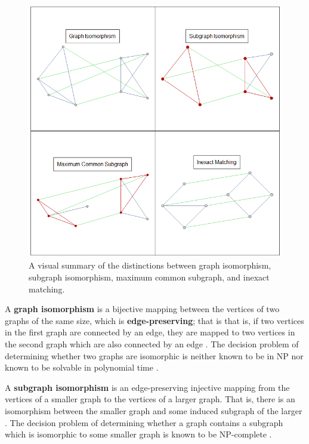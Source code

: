 \documentclass[12pt]{thesis}
\theoremstyle{plain}
\theoremstyle{definition}
\theoremstyle{remark}
\begin{document}
\begin{figure}[!t]
\centering
\includegraphics[width=\textwidth]{isomorphism_demos.png}
\caption{A visual summary of the distinctions between graph isomorphism, subgraph isomorphism, maximum common subgraph, and inexact matching.}
\label{fig:isomorphism_demos}
\end{figure}

A \textbf{graph isomorphism} is a bijective mapping between the vertices of two graphs of the same size, which is \textbf{edge-preserving}; that is  that is, if two vertices in the first graph are connected by an edge, they are mapped to two vertices in the second graph which are also connected by an edge \cite{Conte_2004}. The decision problem of determining whether two graphs are isomorphic is neither known to be in NP nor known to be solvable in polynomial time \cite{wikiGraphIsomorphism}.

A \textbf{subgraph isomorphism} is an edge-preserving injective mapping from the vertices of a smaller graph to the vertices of a larger graph. That is, there is an isomorphism between the smaller graph and some induced subgraph of the larger \cite{Conte_2004}. The decision problem of determining whether a graph contains a subgraph which is isomorphic to some smaller graph is known to be NP-complete \cite{wikiSubgraphIsomorphism}.
\end{document}
